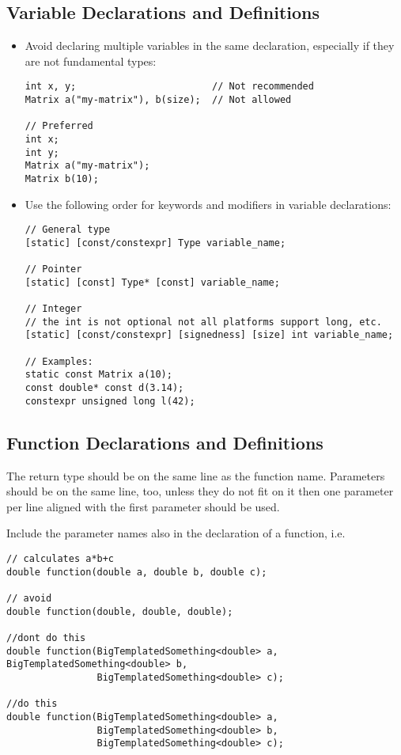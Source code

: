 \subsection{Variable Declarations and Definitions}
\begin{itemize}
\item Avoid declaring multiple variables in the same declaration, especially if they are not fundamental types:

\begin{lstlisting}[showspaces=false]
int x, y;                        // Not recommended
Matrix a("my-matrix"), b(size);  // Not allowed

// Preferred
int x;
int y;
Matrix a("my-matrix");
Matrix b(10);
\end{lstlisting}

\item Use the following order for keywords and modifiers in  variable declarations:

\begin{lstlisting}[showspaces=false]
// General type
[static] [const/constexpr] Type variable_name;

// Pointer
[static] [const] Type* [const] variable_name;

// Integer
// the int is not optional not all platforms support long, etc.
[static] [const/constexpr] [signedness] [size] int variable_name;

// Examples:
static const Matrix a(10);
const double* const d(3.14);
constexpr unsigned long l(42);
\end{lstlisting}

\end{itemize}

\subsection{Function Declarations and Definitions}

The return type should be on the same line as the function name.
Parameters should be on the same line, too, unless they do not fit on it then one parameter
per line aligned with the first parameter should be used.

Include the parameter names also in the declaration of a function, i.e.
\begin{lstlisting}
// calculates a*b+c
double function(double a, double b, double c);

// avoid
double function(double, double, double);

//dont do this
double function(BigTemplatedSomething<double> a, BigTemplatedSomething<double> b,
                BigTemplatedSomething<double> c);

//do this
double function(BigTemplatedSomething<double> a,
                BigTemplatedSomething<double> b,
                BigTemplatedSomething<double> c);

\end{lstlisting}

